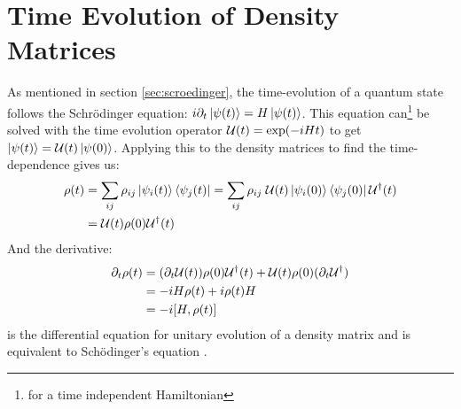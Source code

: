 \section{Time Evolution of Density Matrices} \label{sec: Time Evolution}
As mentioned in section \ref{sec:scroedinger}, the time-evolution of a quantum state follows the Schrödinger equation: $i\partial_t\ket{\psi(t)} = H\ket{\psi(t)}$. This equation can\footnote{for a time independent Hamiltonian} be solved with the time evolution operator $\mathcal{U}(t) = \exp(-iHt)$ to get $\ket{\psi(t)} = \mathcal{U}(t)\ket{\psi(0)}$. Applying this to the density matrices to find the time-dependence gives us:
\begin{align}
    \rho(t) &= \sum_{ij} \rho_{ij} \ket{\psi_i(t)}\bra{\psi_j(t)} = \sum_{ij} \rho_{ij} \; \mathcal{U}(t) \ket{\psi_i(0)}\bra{\psi_j(0)} \mathcal{U}^\dagger(t) \nonumber \\
    &= \mathcal{U}(t) \rho(0) \mathcal{U}^\dagger(t)
\end{align}
And the derivative:
\begin{align}
    \partial_t \rho(t) &= (\partial_t \unitary(t)) \rho(0)\unitary^\dagger(t) + \unitary(t)\rho(0)(\partial_t \unitary^\dagger) \nonumber \\
    &= -iH \rho(t) +i \rho(t) H \nonumber \\
    &= - i \comm{H}{\rho(t)}
\end{align}
is the differential equation for unitary evolution of a density matrix and is equivalent to Schödinger's equation \cite{manzano_short_2020}. 


